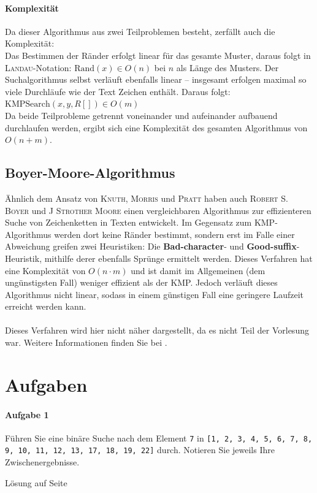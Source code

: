 \documentclass[11pt,a4paper]{scrartcl}
\begin{document}
\paragraph{Komplexität} 
Da dieser Algorithmus aus zwei Teilproblemen besteht, zerfällt auch die Komplexität: \\
Das Bestimmen der Ränder erfolgt linear für das gesamte Muster, daraus folgt in \textsc{Landau}-Notation: $\text{Rand}(x) \in O(n)$ bei $n$ als Länge des Musters.
Der Suchalgorithmus selbst verläuft ebenfalls linear -- insgesamt erfolgen maximal so viele Durchläufe wie der Text Zeichen enthält. Daraus folgt: $\text{KMPSearch}(x, y, R[]) \in O(m)$ \\
Da beide Teilprobleme getrennt voneinander und aufeinander aufbauend durchlaufen werden, ergibt sich eine Komplexität des gesamten Algorithmus von $O(n + m)$. \parencite{KMPRand}
\subsection{Boyer-Moore-Algorithmus}
Ähnlich dem Ansatz von \textsc{Knuth}, \textsc{Morris} und \textsc{Pratt} haben auch \textsc{Robert S. Boyer} und \textsc{J Strother Moore} einen vergleichbaren Algorithmus zur effizienteren Suche von Zeichenketten in Texten entwickelt. Im Gegensatz zum KMP-Algorithmus werden dort keine Ränder bestimmt, sondern erst im Falle einer Abweichung greifen zwei Heuristiken: Die \textbf{Bad-character}- und \textbf{Good-suffix}-Heuristik, mithilfe derer ebenfalls Sprünge ermittelt werden. Dieses Verfahren hat eine Komplexität von $O(n \cdot m)$ und ist damit im Allgemeinen (dem ungünstigsten Fall) weniger effizient als der KMP. Jedoch verläuft dieses Algorithmus nicht linear, sodass in einem günstigen Fall eine geringere Laufzeit erreicht werden kann. \\\\

Dieses Verfahren wird hier nicht näher dargestellt, da es nicht Teil der Vorlesung war. Weitere Informationen finden Sie bei \parencite[][S. 476 -- 478]{Grundkurs}.
\pagebreak
\section*{Aufgaben}
\paragraph{Aufgabe 1} Führen Sie eine binäre Suche nach dem Element \texttt{7} in \texttt{[1, 2, 3, 4, 5, 6, 7, 8, 9, 10, 11, 12, 13, 17, 18, 19, 22]} durch. Notieren Sie jeweils Ihre Zwischenergebnisse. 
\begin{flushright}
Lösung auf Seite \pageref{a2.1:lsg}
\end{flushright}
\end{document}
